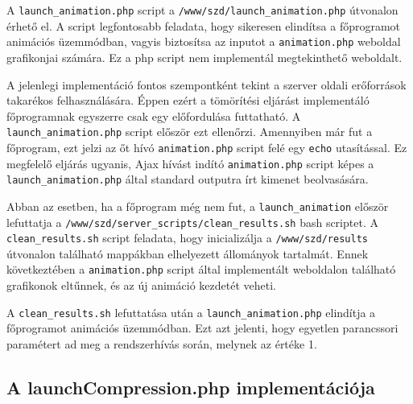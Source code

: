 \documentclass[oneside,titlepage,12pt,a4paper]{report}
\begin{document}
A \texttt{launch\_animation.php} script a \texttt{/www/szd/launch\_animation.php} útvonalon érhető el. A script legfontosabb feladata, hogy sikeresen elindítsa a főprogramot animációs üzemmódban, vagyis biztosítsa az inputot a \texttt{animation.php} weboldal grafikonjai számára. Ez a php script nem implementál megtekinthető weboldalt.
\par A jelenlegi implementáció fontos szempontként tekint a szerver oldali erőforrások takarékos felhasználására. Éppen ezért a tömörítési eljárást implementáló főprogramnak egyszerre csak egy előfordulása futtatható. A \texttt{launch\_animation.php} script először ezt ellenőrzi. Amennyiben már fut a főprogram, ezt jelzi az őt hívó \texttt{animation.php} script felé egy \texttt{echo} utasítással. Ez megfelelő eljárás ugyanis, Ajax hívást indító \texttt{animation.php} script képes a \texttt{launch\_animation.php} által standard outputra írt kimenet beolvasására. 
\par Abban az esetben, ha a főprogram még nem fut, a \texttt{launch\_animation} először lefuttatja a \texttt{/www/szd/server\_scripts/clean\_results.sh} bash scriptet. A \texttt{clean\_results.sh} script feladata, hogy inicializálja a \texttt{/www/szd/results} útvonalon található mappákban elhelyezett állományok tartalmát. Ennek következtében a \texttt{animation.php} script által implementált weboldalon található grafikonok eltűnnek, és az új animáció kezdetét veheti.
\par A \texttt{clean\_results.sh} lefuttatása után a \texttt{launch\_animation.php} elindítja a főprogramot animációs üzemmódban. Ezt azt jelenti, hogy egyetlen parancssori paramétert ad meg a rendszerhívás során, melynek az értéke 1.

\subsection{A launchCompression.php implementációja}
\end{document}
